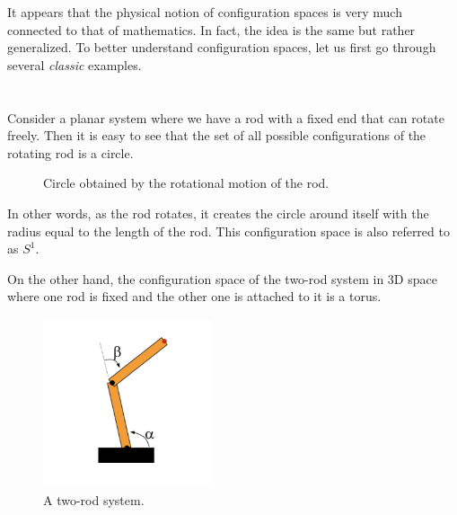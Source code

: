 \documentclass[a4paper, twocolumn]{article}
\theoremstyle{definition}
\begin{document}
It appears that the physical notion of configuration spaces is very much connected to that of mathematics.
In fact, the idea is the same but rather generalized. To better understand configuration spaces, let us
first go through several \textit{classic} examples.

\newpage
\section*{}

\cite{1} Consider a planar system where we have a rod with a fixed end that can rotate freely. Then it is easy to see that the set of all possible configurations
of the rotating rod is a circle.

\begin{figure}[H]
\centering
{}
\caption*{Circle obtained by the rotational motion of the rod.}
\end{figure}

In other words, as the rod rotates, it creates the circle around itself
with the radius equal to the length of the rod. This configuration space
is also referred to as $S^1$.

\medskip

\cite{2} On the other hand, the configuration space of the two-rod
system in 3D space where one rod is fixed and the other one is attached to it is
a torus.

\begin{figure}[H]
\centering
\includegraphics[width=5cm, height=5cm]{two-rod-system}
\caption*{A two-rod system.}
\end{figure}
\end{document}

